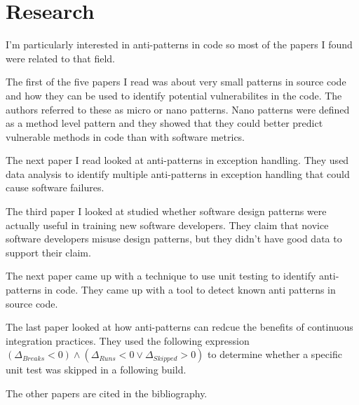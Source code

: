 \documentclass[conference]{IEEEtran}
\begin{document}
\section{Research}
I'm particularly interested in anti-patterns in code so most of the papers I found were related to that field. 

The first of the five papers I read was about very small patterns in source code and how they can be used to identify potential vulnerabilites in the code. The authors\cite{7} referred to these as micro or nano patterns. Nano patterns were defined as a method level pattern and they showed that they could better predict vulnerable methods in code than with software metrics.

The next paper I read looked at anti-patterns in exception handling. They\cite{18}  used data analysis to identify multiple anti-patterns in exception handling that could cause software failures.

The third paper\cite{23} I looked at studied whether software design patterns were actually useful in training new software developers. They claim that novice software developers misuse design patterns, but they didn't have good data to support their claim.

The next paper \cite{25} came up with a technique to use unit testing to identify anti-patterns in code. They came up with a tool to detect known anti patterns in source code. 

The last paper \cite{Carmine} looked at how anti-patterns can redcue the benefits of continuous integration practices. They used the following expression $(\Delta_{Breaks} < 0 ) \wedge (\Delta_{Runs} < 0  \vee \Delta_{Skipped} > 0) $ to determine whether a specific unit test was skipped in a following build.


The other papers are cited in the bibliography. \cite{1} \cite{2} \cite{4} \cite{5} \cite{6}  \cite{8} \cite{9} \cite{10} \cite{11} \cite{12} \cite{13} \cite{14} \cite{15} \cite{16} \cite{17} \cite{19} \cite{20} \cite{21} \cite{22} \cite{23} \cite{24}





\end{document}
